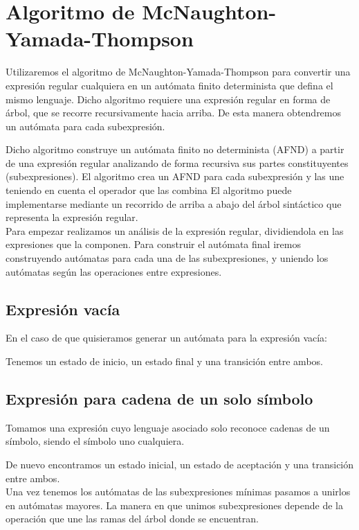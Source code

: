 
\section{Algoritmo de McNaughton-Yamada-Thompson}

Utilizaremos el algoritmo de McNaughton-Yamada-Thompson \cite{dragon} \cite{Thompson:1968:PTR:363347.363387} para convertir una expresión regular cualquiera en un autómata finito determinista que defina el mismo lenguaje.
Dicho algoritmo requiere una expresión regular en forma de árbol, que se recorre recursivamente hacia arriba.
De esta manera obtendremos un autómata para cada subexpresión.


Dicho algoritmo construye un autómata finito no determinista (AFND) a partir de una expresión regular analizando de forma recursiva sus partes constituyentes (subexpresiones).
El algoritmo crea un AFND para cada subexpresión y las une teniendo en cuenta el operador que las combina
El algoritmo puede implementarse mediante un recorrido de arriba a abajo del árbol sintáctico que representa la expresión regular.
\\
Para empezar realizamos un análisis de la expresión regular, dividiendola en las expresiones que la componen.
Para construir el autómata final iremos construyendo autómatas para cada una de las subexpresiones, y uniendo los autómatas según las operaciones entre expresiones.

\subsection{Expresión vacía}
En el caso de que quisieramos generar un autómata para la expresión vacía:


Tenemos un estado de inicio, un estado final y una transición entre ambos.

\subsection{Expresión para cadena de un solo símbolo}
Tomamos una expresión cuyo lenguaje asociado solo reconoce cadenas de un símbolo, siendo el símbolo uno cualquiera.


De nuevo encontramos un estado inicial, un estado de aceptación y una transición entre ambos.
\\
Una vez tenemos los autómatas de las subexpresiones mínimas pasamos a unirlos en autómatas mayores.
La manera en que unimos subexpresiones depende de la operación que une las ramas del árbol donde se encuentran.


